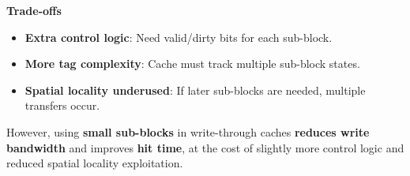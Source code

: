 \highspace
\begin{flushleft}
    \textcolor{Red2}{ \textbf{Trade-offs}}
\end{flushleft}
\begin{itemize}
    \item[\textcolor{Red2}{\faIcon{times}}] \textbf{Extra control logic}: Need valid/dirty bits for each sub-block.
    \item[\textcolor{Red2}{\faIcon{times}}] \textbf{More tag complexity}: Cache must track multiple sub-block states.
    \item[\textcolor{Red2}{\faIcon{times}}] \textbf{Spatial locality underused}: If later sub-blocks are needed, multiple transfers occur.
\end{itemize}
However, using \textbf{small sub-blocks} in write-through caches \textbf{reduces write bandwidth} and improves \textbf{hit time}, at the cost of slightly more control logic and reduced spatial locality exploitation.